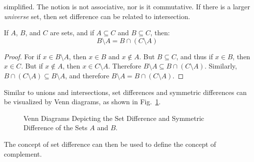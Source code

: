         simplified. The notion is not associative, nor is it
        commutative. If there is a larger \textit{universe}
        set, then set difference can be related to
        intersection.
        \begin{theorem}
            \label{thm:Set_Difference_As_Intersection}%
            If $A$, $B$, and $C$ are sets, and if
            $A\subseteq{C}$ and $B\subseteq{C}$, then:
            \begin{equation}
                B\setminus{A}=B\cap(C\setminus{A})
            \end{equation}
        \end{theorem}
        \begin{proof}
            For if $x\in{B}\setminus{A}$, then
            $x\in{B}$ and $x\notin{A}$. But
            $B\subseteq{C}$, and thus if $x\in{B}$, then
            $x\in{C}$. But if $x\notin{A}$, then
            $x\in{C}\setminus{A}$. Therefore
            $B\setminus{A}\subseteq{B}\cap(C\setminus{A})$.
            Similarly,
            $B\cap(C\setminus{A})\subseteq{B}\setminus{A}$,
            and therefore
            $B\setminus{A}={B}\cap(C\setminus{A})$.
        \end{proof}
        Similar to unions and intersections,
        set differences and symmetric differences can be
        visualized by Venn diagrams, as shown in
        Fig.~\ref{fig:Difference_Sym_Venn_Diagram}.
        \begin{figure}[H]
            \centering
            \captionsetup{type=figure}
            \begin{subfigure}[b]{\textwidth}
                \centering
                
            \end{subfigure}
            \begin{subfigure}[b]{\textwidth}
                \centering
                
            \end{subfigure}
            \caption[Venn Diagrams for Set Difference
                     and Symmetric Difference]
                    {Venn Diagrams Depicting the Set
                     Difference and Symmetric Difference
                     of the Sets $A$ and $B$.}
            \label{fig:Difference_Sym_Venn_Diagram}
        \end{figure}
        The concept of set difference can then be used to
        define the concept of complement.
